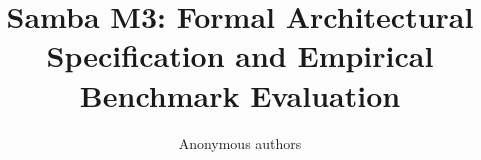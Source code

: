 \title{\textbf{Samba M3: Formal Architectural Specification and Empirical Benchmark Evaluation}}

\author{Anonymous authors}
